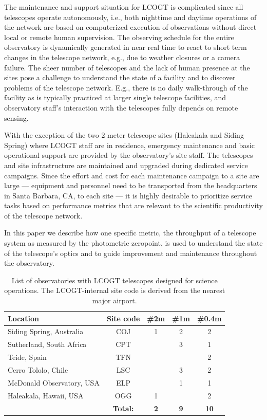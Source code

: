 \documentclass[]{spie}
\begin{document}
The maintenance and support situation for LCOGT is complicated since all telescopes operate
autonomously, i.e., both nighttime and daytime operations of the network are based on computerized
execution of observations without direct local or remote human supervision. The observing schedule
for the entire observatory is dynamically generated in near real time to react to short term changes
in the telescope network\cite{saunders2014}, e.g., due to weather closures or a camera failure. The
sheer number of telescopes and the lack of human presence at the sites pose a challenge to
understand the state of a facility  and to discover problems of the telescope network. E.g., there
is no daily walk-through of the facility as is typically practiced at larger single telescope
facilities, and observatory staff's interaction with the telescopes fully depends on remote sensing.

With the exception of the two 2 meter telescope sites (Haleakala and Siding Spring) where LCOGT
staff are in residence, emergency maintenance and basic operational support are provided by the
observatory's site staff. The telescopes and site infrastructure are maintained and upgraded during
dedicated service campaigns. Since the effort and cost for each maintenance campaign to a site are
large --- equipment and personnel need to be transported from the headquarters in Santa Barbara, CA,
to each site --- it is highly desirable to prioritize service tasks based on performance metrics
that are relevant to the scientific productivity of the telescope network.


In this paper we describe how one specific metric, the throughput of a telescope system as measured
by the photometric zeropoint, is used to understand the state of the
telescope's optics and to guide improvement and maintenance throughout the observatory.


\begin{table}[h]
\centering
\begin{tabular} {|l|c|ccc|} \hline
Location                  & Site code & \#2m & \#1m & \#0.4m \\ \hline
Siding Spring, Australia & COJ & 1 & 2 & 2  \\
Sutherland, South Africa  & CPT &   & 3 & 1 \\
Teide, Spain              & TFN &   &   & 2 \\
Cerro Tololo, Chile       & LSC &   & 3 & 2 \\
McDonald Observatory, USA & ELP &   & 1 & 1\\
Haleakala, Hawaii, USA    & OGG & 1 &   & 2 \\\hline
                       &   \bf Total:  & \bf 2 & \bf 9 & \bf 10 \\ \hline
\end{tabular}
\vspace{1ex}
\caption{\label{tab_sites} List of observatories with LCOGT telescopes designed for science
operations. The LCOGT-internal site code is derived from the nearest major airport. }
\end{table}
\end{document}
